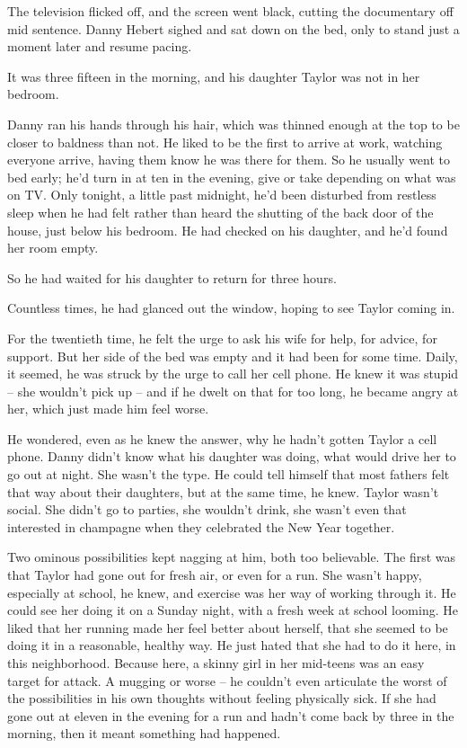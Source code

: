 The television flicked off, and the screen went black, cutting the documentary off mid sentence.  Danny Hebert sighed and sat down on the bed, only to stand just a moment later and resume pacing.



It was three fifteen in the morning, and his daughter Taylor was not in her bedroom.



Danny ran his hands through his hair, which was thinned enough at the top to be closer to baldness than not.  He liked to be the first to arrive at work, watching everyone arrive, having them know he was there for them.  So he usually went to bed early; he'd turn in at ten in the evening, give or take depending on what was on TV.  Only tonight, a little past midnight, he'd been disturbed from restless sleep when he had felt rather than heard the shutting of the back door of the house, just below his bedroom.  He had checked on his daughter, and he'd found her room empty.



So he had waited for his daughter to return for three hours.



Countless times, he had glanced out the window, hoping to see Taylor coming in.



For the twentieth time, he felt the urge to ask his wife for help, for advice, for support.  But her side of the bed was empty and it had been for some time.  Daily, it seemed, he was struck by the urge to call her cell phone.  He knew it was stupid – she wouldn't pick up – and if he dwelt on that for too long, he became angry at her, which just made him feel worse.



He wondered, even as he knew the answer, why he hadn't gotten Taylor a cell phone.  Danny didn't know what his daughter was doing, what would drive her to go out at night.  She wasn't the type.  He could tell himself that most fathers felt that way about their daughters, but at the same time, he knew.  Taylor wasn't social.  She didn't go to parties, she wouldn't drink, she wasn't even that interested in champagne when they celebrated the New Year together.



Two ominous possibilities kept nagging at him, both too believable.  The first was that Taylor had gone out for fresh air, or even for a run.  She wasn't happy, especially at school, he knew, and exercise was her way of working through it.  He could see her doing it on a Sunday night, with a fresh week at school looming.  He liked that her running made her feel better about herself, that she seemed to be doing it in a reasonable, healthy way. He just hated that she had to do it here, in this neighborhood.  Because here, a skinny girl in her mid-teens was an easy target for attack.  A mugging or worse – he couldn't even articulate the worst of the possibilities in his own thoughts without feeling physically sick.  If she had gone out at eleven in the evening for a run and hadn't come back by three in the morning, then it meant something had happened.



